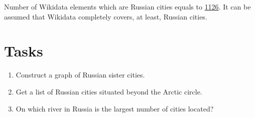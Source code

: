 Number of Wikidata elements which are Russian cities equals to \href{https://w.wiki/ngM}{\num{1126}}. It can be assumed that Wikidata completely covers, at least, Russian cities.

\section{Tasks}
\begin{enumerate}
\item Construct a graph of Russian sister cities.
\item Get a list of Russian cities situated beyond the Arctic circle.
\item On which river in Russia is the largest number of cities located?
\end{enumerate}